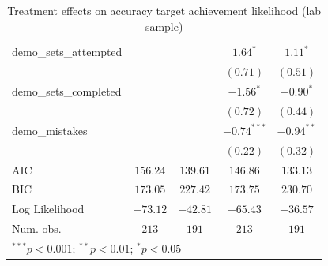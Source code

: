 \documentclass[
  12,
  letterpaper,
  DIV=11,
  numbers=noendperiod]{scrartcl}
\begin{document}
\begin{table}
{\begin{center}
\begin{tabular}{l c c c c}
demo\_sets\_attempted           &               &               & $1.64^{*}$    & $1.11^{*}$    \\
                                &               &               & $(0.71)$      & $(0.51)$      \\
demo\_sets\_completed           &               &               & $-1.56^{*}$   & $-0.90^{*}$   \\
                                &               &               & $(0.72)$      & $(0.44)$      \\
demo\_mistakes                  &               &               & $-0.74^{***}$ & $-0.94^{**}$  \\
                                &               &               & $(0.22)$      & $(0.32)$      \\
\hline
AIC                             & $156.24$      & $139.61$      & $146.86$      & $133.13$      \\
BIC                             & $173.05$      & $227.42$      & $173.75$      & $230.70$      \\
Log Likelihood                  & $-73.12$      & $-42.81$      & $-65.43$      & $-36.57$      \\
Num. obs.                       & $213$         & $191$         & $213$         & $191$         \\
\hline
\multicolumn{5}{l}{\scriptsize{$^{***}p<0.001$; $^{**}p<0.01$; $^{*}p<0.05$}}
\end{tabular}
\label{table:coefficients}
\end{center}

}

\caption{\label{tbl-reg-target-lab}Treatment effects on accuracy target
achievement likelihood (lab sample)}

\end{table}%
\end{document}
